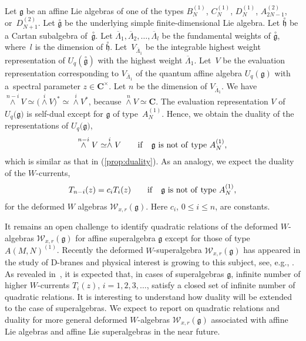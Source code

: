 \documentclass[pdftex]{sigma}
\numberwithin{equation}{section}
\begin{document}
Let ${\mathfrak g}$ be an affine Lie algebras of one of the types
$B_N^{(1)}$, $C_N^{(1)}$, $D_N^{(1)}$, $A_{2N-1}^{(2)}$, or~$D_{N+1}^{(2)}$.
Let $\stackrel{\circ}{\mathfrak g}$ be
the underlying simple finite-dimensional Lie algebra.
Let $\stackrel{\circ}{\mathfrak h}$ be a Cartan subalgebra of~$\stackrel{\circ}{\mathfrak g}$.
Let $\overline{\Lambda}_1, \overline{\Lambda}_2, \dots, \overline{\Lambda}_l$
be the fundamental weights of $\stackrel{\circ}{\mathfrak g}$, where~$l$ is the dimension of $\stackrel{\circ}{\mathfrak h}$.
Let~$V_{\overline{\Lambda}_1}$ be the integrable highest weight representation of
$U_q(\stackrel{\circ}{\mathfrak g})$ with the highest weight $\overline{\Lambda}_1$.
Let~$V$ be the evaluation representation corresponding to $V_{\overline{\Lambda}_1}$
of the quantum affine algebra $U_q({\mathfrak g})$
with a~spectral parameter $z \in {\mathbf C}^\times$.
Let $n$ be the dimension of $V_{\overline{\Lambda}_1}$.
We have $\stackrel{n-i}{\wedge} V \simeq\bigl(\stackrel{i}{\wedge} V \bigr)^* \simeq
\stackrel{i}{\wedge} V^*$, because $\stackrel{n}{\wedge} V \simeq {\mathbf C}$.
The evaluation representation $V$ of $U_q\big({\mathfrak g}\big)$ is self-dual except for
${\mathfrak g}$ of type~$A_N^{(1)}$. Hence, we obtain the duality of the representations of
$U_q\bigl({\mathfrak g}\bigr)$,
\begin{gather*}
\stackrel{n-i}{\wedge} V \simeq
\stackrel{i}{\wedge} V\qquad {\rm if}\quad {\mathfrak g}~{\rm is~not~of~type}~A_N^{(1)},
\end{gather*}
which is similar as {that} in (\ref{prop:duality}).
As an analogy, we expect the duality of the $W$-currents,
\begin{gather*}
T_{n-i}(z)=c_i T_i(z)\qquad {\rm if}\quad
{\mathfrak g}~{\rm is~not~of~type}~A_N^{(1)},
\end{gather*}
for the deformed $W$ algebras ${\mathcal W}_{x,r}({\mathfrak g})$.
Here $c_i$, $0 \leq i \leq n$, are constants.


It remains an open challenge
to identify quadratic relations of the deformed $W$-algebras
${\mathcal W}_{x,r}({\mathfrak g})$ for affine
superalgebra ${\mathfrak g}$
except for those of type $A(M,N)^{(1)}$.
Recently the deformed $W$-superalgebra
${\mathcal W}_{x,r}({\mathfrak g})$
has appeared in the study of D-branes and physical interest is growing to this subject, see, e.g.,
\cite{Harada-Matsuo-Noshita-Watanabe}.
As revealed in~\cite{Harada-Matsuo-Noshita-Watanabe, Kojima2, Kojima1},
it is expected that, in cases of superalgebras ${\mathfrak g}$,
infinite number of higher $W$-currents $T_i(z)$, $i=1,2,3,\dots$,
satisfy a closed set of infinite number of quadratic relations.
It is interesting to understand how duality will be extended to the case of superalgebras.
We expect to report on quadratic relations and duality
for more general deformed $W$-algebras
${\mathcal W}_{x,r}({\mathfrak g})$ associated with
affine Lie algebras and affine Lie superalgebras in the near future.
\end{document}
